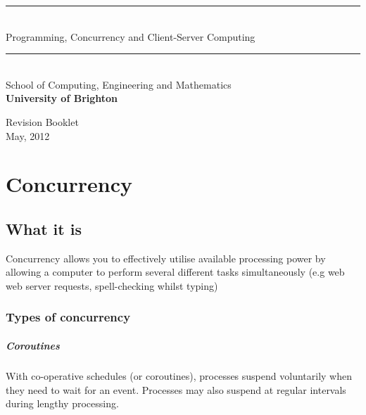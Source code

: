 \documentclass[a4paper,oneside]{report}
\newcommand{\HRuleLight}{\rule{\linewidth}{0.1mm}}
\begin{document}
%
%
\begin{titlepage}
\begin{center}

\HRuleLight\\[0.5cm]

\Huge Programming, Concurrency and Client-Server Computing

\HRuleLight\\[0.2cm]

\large School of Computing, Engineering and Mathematics\\ \textbf{University of Brighton}

\vfill
\huge Revision Booklet\\
\large May, 2012\\

\end{center}
\end{titlepage}


%
%
{
	\renewcommand\thepage{}
	\setcounter{tocdepth}{3}
	\tableofcontents
	\clearpage
}

\setcounter{page}{1}


%
%


\chapter{Concurrency}
	\section{What it is}
	
	Concurrency allows you to effectively utilise available processing power by allowing a computer to perform several different tasks simultaneously (e.g web web server requests, spell-checking whilst typing)
	
    	\subsection{Types of concurrency}
    	
    	\paragraph{Coroutines} With co-operative schedules (or coroutines), processes suspend voluntarily  when they need to wait for an event. Processes may also suspend at regular intervals during lengthy processing.
    	
\end{document}
